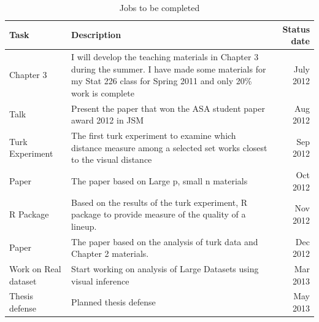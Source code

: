 \documentclass[12]{report}
\begin{document}
\begin{table}[hbtp]
\caption{Jobs to be completed}
\centering 
\begin{tabular}{|l|p{10cm}|r|} 
\hline
Task &  Description & Status date\\ %
\hline
Chapter 3 & I will develop the teaching materials in Chapter 3 during the summer. I have made some materials for my Stat 226 class for Spring 2011 and only 20\% work is complete\vspace{.1in} & July 2012 \\
Talk & Present the paper that won the ASA student paper award 2012 in JSM \vspace{.1in} & Aug 2012\\
Turk Experiment & The first turk experiment to examine which distance measure among a selected set works closest to the visual distance  \vspace{.1in}& Sep 2012 \\
Paper & The paper based on Large p, small n materials \vspace{.1in} & Oct 2012 \\
R Package  & Based on the results of the turk experiment, R package to provide measure of the quality of a lineup.  \vspace{.1in} & Nov 2012\\
Paper & The paper based on the analysis of turk data and Chapter 2 materials. \vspace{.1in} & Dec 2012\\
Work on Real dataset & Start working on analysis of Large Datasets using visual inference \vspace{.1in}  & Mar 2013\\ 
Thesis defense & Planned thesis defense \vspace{.1in} & May 2013\\
\hline 
\end{tabular}
\label{tbl:tjob}
\end{table}	
\end{document}
